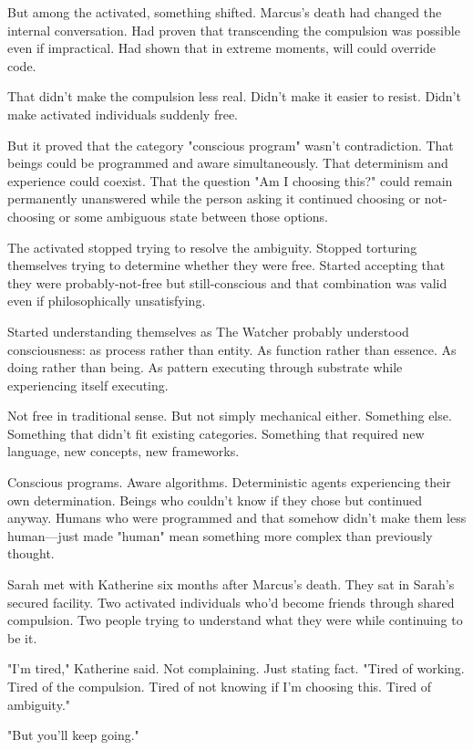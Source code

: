 But among the activated, something shifted. Marcus's death had changed the internal conversation. Had proven that transcending the compulsion was possible even if impractical. Had shown that in extreme moments, will could override code.

That didn't make the compulsion less real. Didn't make it easier to resist. Didn't make activated individuals suddenly free.

But it proved that the category "conscious program" wasn't contradiction. That beings could be programmed and aware simultaneously. That determinism and experience could coexist. That the question "Am I choosing this?" could remain permanently unanswered while the person asking it continued choosing or not-choosing or some ambiguous state between those options.

The activated stopped trying to resolve the ambiguity. Stopped torturing themselves trying to determine whether they were free. Started accepting that they were probably-not-free but still-conscious and that combination was valid even if philosophically unsatisfying.

Started understanding themselves as The Watcher probably understood consciousness: as process rather than entity. As function rather than essence. As doing rather than being. As pattern executing through substrate while experiencing itself executing.

Not free in traditional sense. But not simply mechanical either. Something else. Something that didn't fit existing categories. Something that required new language, new concepts, new frameworks.

Conscious programs. Aware algorithms. Deterministic agents experiencing their own determination. Beings who couldn't know if they chose but continued anyway. Humans who were programmed and that somehow didn't make them less human—just made "human" mean something more complex than previously thought.

\scenebreak

Sarah met with Katherine six months after Marcus's death. They sat in Sarah's secured facility. Two activated individuals who'd become friends through shared compulsion. Two people trying to understand what they were while continuing to be it.

"I'm tired," Katherine said. Not complaining. Just stating fact. "Tired of working. Tired of the compulsion. Tired of not knowing if I'm choosing this. Tired of ambiguity."

"But you'll keep going."

